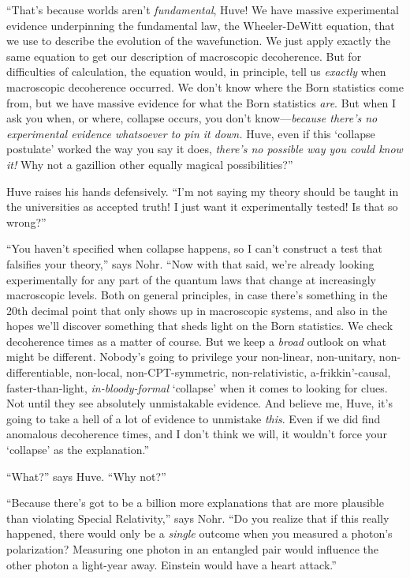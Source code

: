 {
 ``That's because worlds
aren't \textit{fundamental}, Huve! We have massive
experimental evidence underpinning the fundamental law, the
Wheeler-DeWitt equation, that we use to describe the evolution of the
wavefunction. We just apply exactly the same equation to get our
description of macroscopic decoherence. But for difficulties of
calculation, the equation would, in principle, tell us \textit{exactly}
when macroscopic decoherence occurred. We don't know
where the Born statistics come from, but we have massive evidence for
what the Born statistics \textit{are}. But when I ask you when, or
where, collapse occurs, you don't
know---\textit{because there's no experimental evidence
whatsoever to pin it down.} Huve, even if this `collapse
postulate' worked the way you say it does,
\textit{there's no possible way you could know it!} Why
not a gazillion other equally magical
possibilities?''}

{
 Huve raises his hands defensively.
``I'm not saying my theory should be
taught in the universities as accepted truth! I just want it
experimentally tested! Is that so wrong?''}

{
 ``You haven't specified when
collapse happens, so I can't construct a test that
falsifies your theory,'' says Nohr.
``Now with that said, we're already
looking experimentally for any part of the quantum laws that change at
increasingly macroscopic levels. Both on general principles, in case
there's something in the 20th decimal point that only
shows up in macroscopic systems, and also in the hopes
we'll discover something that sheds light on the Born
statistics. We check decoherence times as a matter of course. But we
keep a \textit{broad} outlook on what might be different.
Nobody's going to privilege your non-linear,
non-unitary, non-differentiable, non-local, non-CPT-symmetric,
non-relativistic, a-frikkin'-causal, faster-than-light,
\textit{in-bloody-formal} `collapse'
when it comes to looking for clues. Not until they see absolutely
unmistakable evidence. And believe me, Huve, it's going
to take a hell of a lot of evidence to unmistake \textit{this}. Even if
we did find anomalous decoherence times, and I don't
think we will, it wouldn't force your
`collapse' as the
explanation.''}

{
 ``What?'' says Huve.
``Why not?''}

{
 ``Because there's got to be a
billion more explanations that are more plausible than violating
Special Relativity,'' says Nohr.
``Do you realize that if this really happened, there
would only be a \textit{single} outcome when you measured a
photon's polarization? Measuring one photon in an
entangled pair would influence the other photon a light-year away.
Einstein would have a heart attack.''}

